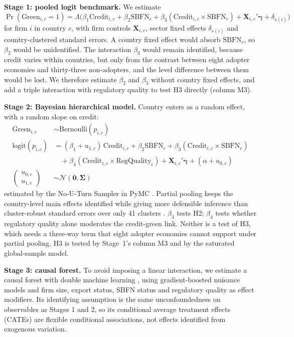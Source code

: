\documentclass[review,authoryear,12pt]{elsarticle}
\begin{document}
\textbf{Stage 1: pooled logit benchmark.} We estimate
\begin{equation}
\Pr(\text{Green}_{i,c}=1) = \Lambda\Big(\beta_1 \text{Credit}_{i,c} + \beta_2 \text{SBFN}_c + \beta_3 (\text{Credit}_{i,c}\times \text{SBFN}_c) + \mathbf{X}_{i,c}'\boldsymbol{\gamma} + \delta_{s(i)}\Big)
\end{equation}
for firm $i$ in country $c$, with firm controls $\mathbf{X}_{i,c}$, sector fixed effects $\delta_{s(i)}$ and country-clustered standard errors. A country fixed effect would absorb $\text{SBFN}_c$, so $\beta_2$ would be unidentified. The interaction $\beta_3$ would remain identified, because credit varies within countries, but only from the contrast between eight adopter economies and thirty-three non-adopters, and the level difference between them would be lost. We therefore estimate $\beta_2$ and $\beta_3$ without country fixed effects, and add a triple interaction with regulatory quality to test H3 directly (column M3).

\textbf{Stage 2: Bayesian hierarchical model.} Country enters as a random effect, with a random slope on credit:
\begin{align}
\text{Green}_{i,c} &\sim \text{Bernoulli}(p_{i,c}) \\
\text{logit}(p_{i,c}) &= (\beta_1 + u_{1,c})\,\text{Credit}_{i,c} + \beta_2 \text{SBFN}_c + \beta_3(\text{Credit}_{i,c}\times \text{SBFN}_c) \nonumber \\
&\quad + \beta_4 (\text{Credit}_{i,c}\times \text{RegQuality}_c) + \mathbf{X}_{i,c}'\boldsymbol{\gamma} + (\alpha + u_{0,c}) \\
\begin{pmatrix} u_{0,c} \\ u_{1,c} \end{pmatrix} &\sim \mathcal{N}\left(\mathbf{0}, \boldsymbol{\Sigma}\right)
\end{align}
estimated by the No-U-Turn Sampler in PyMC \citep{salvatier2016}. Partial pooling keeps the country-level main effects identified while giving more defensible inference than cluster-robust standard errors over only 41 clusters \citep{cameron2015,gelman2007}. $\beta_3$ tests H2; $\beta_4$ tests whether regulatory quality alone moderates the credit-green link. Neither is a test of H3, which needs a three-way term that eight adopter economies cannot support under partial pooling. H3 is tested by Stage~1's column M3 and by the saturated global-sample model.

\textbf{Stage 3: causal forest.} To avoid imposing a linear interaction, we estimate a causal forest with double machine learning \citep{athey2019grf,chernozhukov2018,wager2018}, using gradient-boosted nuisance models and firm size, export status, SBFN status and regulatory quality as effect modifiers. Its identifying assumption is the same unconfoundedness on observables as Stages 1 and 2, so its conditional average treatment effects (CATEs) are flexible conditional associations, not effects identified from exogenous variation.
\end{document}
